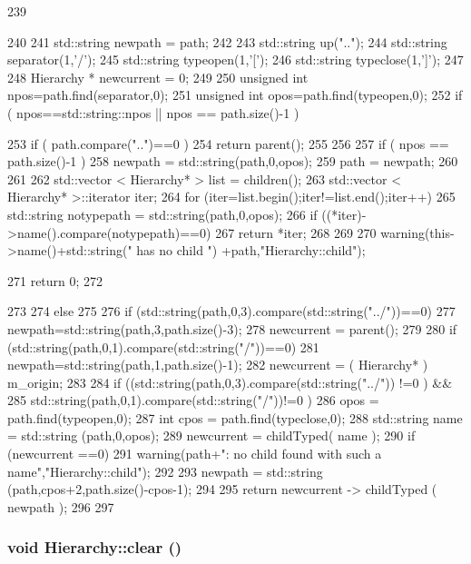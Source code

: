 \begin{DoxyCode}
239                                               {
240 
241   std::string newpath = path;
242 
243   std::string up("..");
244   std::string separator(1,'/');
245   std::string typeopen(1,'[');
246   std::string typeclose(1,']');
247 
248   Hierarchy * newcurrent = 0;
249 
250   unsigned int npos=path.find(separator,0);
251   unsigned int opos=path.find(typeopen,0);
252   if ( npos==std::string::npos || npos == path.size()-1 ){
253     if ( path.compare("..")==0 ) {
254       return parent();
255     }
256 
257     if ( npos == path.size()-1 ) {
258       newpath = std::string(path,0,opos);
259       path = newpath;
260     }
261 
262     std::vector < Hierarchy* > list = children();
263     std::vector < Hierarchy* >::iterator iter;
264     for (iter=list.begin();iter!=list.end();iter++){
265       std::string notypepath = std::string(path,0,opos);
266       if ((*iter)->name().compare(notypepath)==0){
267         return *iter;
268       }
269     }
270     warning(this->name()+std::string(" has no child ") +path,"Hierarchy::child");
      
271     return 0;
272   }
273 
274   else {
275 
276     if (std::string(path,0,3).compare(std::string("../"))==0) {
277       newpath=std::string(path,3,path.size()-3);
278       newcurrent = parent();
279     }
280     if (std::string(path,0,1).compare(std::string("/"))==0) {
281       newpath=std::string(path,1,path.size()-1);
282       newcurrent = ( Hierarchy* ) m_origin;
283     }
284     if ((std::string(path,0,3).compare(std::string("../")) !=0 ) &&
285         std::string(path,0,1).compare(std::string("/"))!=0 ) {
286       opos = path.find(typeopen,0);
287       int cpos = path.find(typeclose,0);
288       std::string name = std::string (path,0,opos);
289       newcurrent = childTyped( name );
290       if (newcurrent ==0){
291         warning(path+": no child found with such a name","Hierarchy::child");
292       }
293       newpath = std::string (path,cpos+2,path.size()-cpos-1);
294     }
295     return newcurrent -> childTyped ( newpath );
296   }
297 }
\end{DoxyCode}
\hypertarget{classHierarchy_af4d43b0765b402670eed2d62c73405af}{
\subsubsection[{clear}]{\setlength{\rightskip}{0pt plus 5cm}void Hierarchy::clear ()}}
\label{classHierarchy_af4d43b0765b402670eed2d62c73405af}


